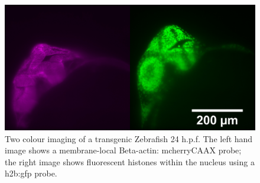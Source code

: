 

\begin{figure}
    \centering
    \includegraphics[width=0.8\linewidth]{./fish_image}
    \caption{Two colour imaging of a transgenic Zebrafish 24 h.p.f.
    The left hand image shows a membrane-local  Beta-actin: mcherryCAAX probe;
    the right image shows fluorescent histones within the nucleus using a h2b:gfp probe.}
    \label{fig:fish_image}
\end{figure}

